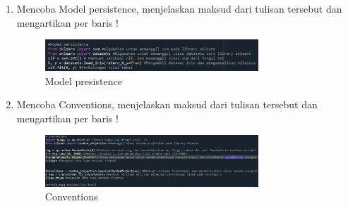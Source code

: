 \begin{enumerate}
    \item Mencoba Model persistence, menjelaskan maksud dari tulisan tersebut dan mengartikan per baris ! \\
    
     \begin{figure}[!htbp]
        \centering
        \includegraphics [width=8cm]{figures/Modelpresistence.PNG}
        \caption{Model presistence}
        \label{fig:my_label}
        \end{figure}
        
    \item Mencoba Conventions, menjelaskan maksud dari tulisan tersebut dan mengartikan per baris !
    
      \begin{figure}[!htbp]
        \centering
        \includegraphics [width=8cm]{figures/Conventions.PNG}
        \caption{Conventions}
        \label{fig:my_label}
        \end{figure}
    
\end{enumerate}